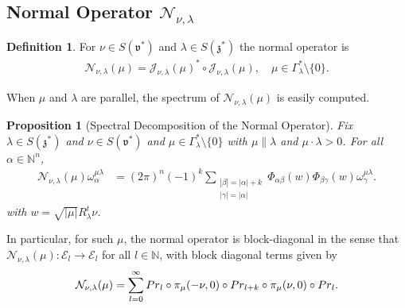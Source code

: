 \documentclass[11pt]{amsart}
\theoremstyle{plain}
\newtheorem{proposition}[theorem]{Proposition}
\theoremstyle{definition}
\newtheorem{definition}[theorem]{Definition}
\theoremstyle{remark}
\numberwithin{equation}{section}
\def\fz{\mathfrak{z}}
\def\fv{\mathfrak{v}}
\def\cE{\mathcal{E}}
\def\cN{\mathcal{N}}
\def\cJ{\mathcal{J}}
\def\mz{\setminus\{0\}}
\def\N{{\mathbb N}}%
\numberwithin{equation}{section}
\begin{document}
\subsection{Normal Operator $\cN_{\nu, \lambda}$}
\begin{definition}
	For $\nu\in S(\fv^*)$ and $\lambda\in S(\fz^*)$ the  normal operator is 
	\begin{align*} 
		\cN_{\nu, \lambda}(\mu)=\cJ_{\nu, \lambda}(\mu)^*\circ\cJ_{\nu, \lambda}(\mu), \quad \mu\in \Gamma_\lambda^*\mz.
	\end{align*}
\end{definition}
When $\mu$ and $\lambda$ are parallel, the spectrum of $\cN_{\nu, \lambda}(\mu)$ is easily computed. 
\begin{proposition}[Spectral Decomposition of the Normal Operator]\label{p:normalParallel}
	Fix $\lambda\in S(\fz^*)$ and $\nu\in S(\fv^*)$ and $\mu\in \Gamma_\lambda^*\mz$ with $\mu\parallel\lambda$ and $\mu\cdot\lambda>0$. For all $\alpha\in \N^n$, 
	\begin{align*}
	\cN_{\nu, \lambda}(\mu)\omega_\alpha^{\mu\lambda}
	&=(2\pi)^n(-1)^k\sum_{\substack{|\beta|=|\alpha|+k \\ |\gamma|=|\alpha|}}\Phi_{\alpha\beta}(w)\Phi_{\beta\gamma}(w)\omega_\gamma^{\mu\lambda}.
	\end{align*}
with $w=\sqrt{|\mu|}R_\lambda^t\nu$.
\end{proposition}


In particular, for such $\mu$, the normal operator is block-diagonal in the sense that $\cN_{\nu, \lambda}(\mu): \cE_l\to \cE_l$ for all $l\in \N$, with block diagonal terms given by
\begin{align*}
	\cN_{\nu, \lambda}(\mu)=\sum_{l=0}^\infty {{\rm Pr}}_{l}\circ \pi_\mu(-\nu, 0)\circ {{\rm Pr}}_{l+k}\circ\pi_\mu(\nu, 0)\circ {{\rm Pr}}_{l}.
\end{align*}
\end{document}
